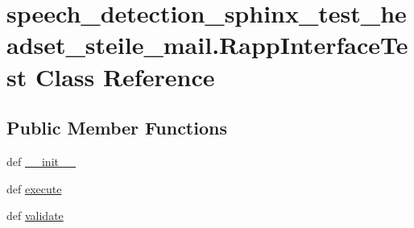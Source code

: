 \hypertarget{classspeech__detection__sphinx__test__headset__steile__mail_1_1RappInterfaceTest}{\section{speech\-\_\-detection\-\_\-sphinx\-\_\-test\-\_\-headset\-\_\-steile\-\_\-mail.\-Rapp\-Interface\-Test Class Reference}
\label{classspeech__detection__sphinx__test__headset__steile__mail_1_1RappInterfaceTest}
}
\subsection*{Public Member Functions}
\begin{DoxyCompactItemize}
\item 
def \hyperlink{classspeech__detection__sphinx__test__headset__steile__mail_1_1RappInterfaceTest_ae364ca3bf9f267d6ce2a6c23d1cbbdcb}{\-\_\-\-\_\-init\-\_\-\-\_\-}
\item 
def \hyperlink{classspeech__detection__sphinx__test__headset__steile__mail_1_1RappInterfaceTest_a2403c2860814225242e240eba682cdd5}{execute}
\item 
def \hyperlink{classspeech__detection__sphinx__test__headset__steile__mail_1_1RappInterfaceTest_af60bdcb1162dce2a3e1001d21c13d247}{validate}
\end{DoxyCompactItemize}

